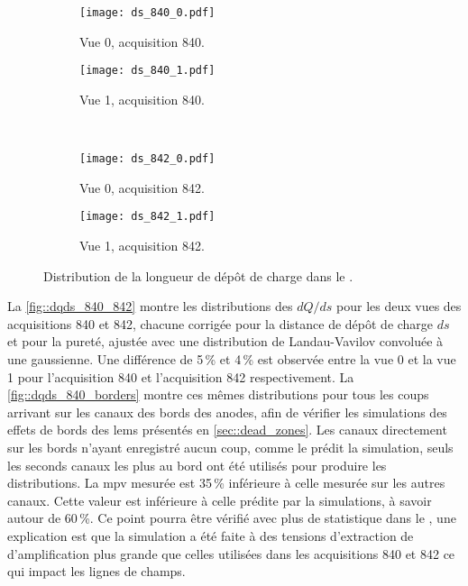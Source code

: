     \begin{figure}[htbp]
      \centering
      \begin{subfigure}[t]{0.48\textwidth}
        \centering
        \texttt{[image: ds\_840\_0.pdf]}
        \caption{Vue 0, acquisition 840.}
      \end{subfigure}\hfill
      \begin{subfigure}[t]{0.48\textwidth}
        \centering
        \texttt{[image: ds\_840\_1.pdf]}
        \caption{Vue 1, acquisition 840.}
      \end{subfigure}\\
      \begin{subfigure}[t]{0.48\textwidth}
        \centering
        \texttt{[image: ds\_842\_0.pdf]}
        \caption{Vue 0, acquisition 842.}
      \end{subfigure}\hfill
      \begin{subfigure}[t]{0.48\textwidth}
        \centering
        \texttt{[image: ds\_842\_1.pdf]}
        \caption{Vue 1, acquisition 842.}
      \end{subfigure}
      \caption[Distribution de la longueur de dépôt de charge dans le \TOO{}]{\label{fig::ds_840_842}Distribution de la longueur de dépôt de charge dans le \TOO{}.}
    \end{figure}

      La \autoref{fig::dqds_840_842} montre les distributions des $dQ/ds$ pour les deux vues des acquisitions 840 et 842, chacune corrigée pour la distance de dépôt de charge $ds$ et pour la pureté, ajustée avec une distribution de Landau-Vavilov convoluée à une gaussienne. Une différence de 5\,\% et 4\,\% est observée entre la vue 0 et la vue 1 pour l'acquisition 840 et l'acquisition 842 respectivement. La \autoref{fig::dqds_840_borders} montre ces mêmes distributions pour tous les coups arrivant sur les  canaux des bords des anodes, afin de vérifier les simulations des effets de bords des \glspl{lem} présentés en \autoref{sec::dead_zones}. Les canaux directement sur les bords n'ayant enregistré aucun coup, comme le prédit la simulation, seuls les seconds canaux les plus au bord ont été utilisés pour produire les distributions. La \gls{mpv} mesurée est 35\,\% inférieure à celle mesurée sur les autres canaux. Cette valeur est inférieure à celle prédite par la simulations, à savoir autour de 60\,\%. Ce point pourra être vérifié avec plus de statistique dans le \SSS{}, une explication est que la simulation a été faite à des tensions d'extraction de d'amplification plus grande que celles utilisées dans les acquisitions 840 et 842 ce qui impact les lignes de champs.

